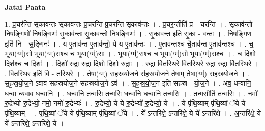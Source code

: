 \documentclass[17pt]{extarticle}
\begin{document}
\textbf{Jatai Paata} \newline

1. प्र॒चर॑न्ति सृ॒काव॑न्तः सृ॒काव॑न्तः प्र॒चर॑न्ति प्र॒चर॑न्ति सृ॒काव॑न्तः । . प्र॒चर॒न्तीति॑ प्र - चर॑न्ति । . सृ॒काव॑न्तो निष॒ङ्गिणो॑ निष॒ङ्गिणः॑ सृ॒काव॑न्तः सृ॒काव॑न्तो निष॒ङ्गिणः॑ । . सृ॒काव॑न्त॒ इति॑ सृ॒का - व॒न्तः॒ । . नि॒ष॒ङ्गिण॒ इति॑ नि - स॒ङ्गिनः॑ । . य ए॒ताव॑न्त ए॒ताव॑न्तो॒ ये य ए॒ताव॑न्तः । . ए॒ताव॑न्तश्च चै॒ताव॑न्त ए॒ताव॑न्तश्च । . च॒ भूया(ग्म्॑)सो॒ भूया(ग्म्॑)सश्च च॒ भूया(ग्म्॑)सः । . भूया(ग्म्॑)सश्च च॒ भूया(ग्म्॑)सो॒ भूया(ग्म्॑)सश्च । . च॒ दिशो॒ दिश॑श्च च॒ दिशः॑ । . दिशो॑ रु॒द्रा रु॒द्रा दिशो॒ दिशो॑ रु॒द्राः । . रु॒द्रा वि॑तस्थि॒रे वि॑तस्थि॒रे रु॒द्रा रु॒द्रा वि॑तस्थि॒रे । . वि॒त॒स्थि॒र इति॑ वि - त॒स्थि॒रे । . तेषा(ग्म्॑) सहस्रयोज॒ने स॑हस्रयोज॒ने तेषा॒म् तेषा(ग्म्॑) सहस्रयोज॒ने । . स॒ह॒स्र॒यो॒ज॒ने ऽवाव॑ सहस्रयोज॒ने स॑हस्रयोज॒ने ऽव॑ । . स॒ह॒स्र॒यो॒ज॒न इति॑ सहस्र - यो॒ज॒ने । . अव॒ धन्वा॑नि॒ धन्वा॒ न्यवाव॒ धन्वा॑नि । . धन्वा॑नि तन्मसि तन्मसि॒ धन्वा॑नि॒ धन्वा॑नि तन्मसि । . त॒न्म॒सीति॑ तन्मसि । . नमो॑ रु॒द्रेभ्यो॑ रु॒द्रेभ्यो॒ नमो॒ नमो॑ रु॒द्रेभ्यः॑ । . रु॒द्रेभ्यो॒ ये ये रु॒द्रेभ्यो॑ रु॒द्रेभ्यो॒ ये । . ये पृ॑थि॒व्याम् पृ॑थि॒व्यां ॅये ये पृ॑थि॒व्याम् । . पृ॒थि॒व्यां ॅये ये पृ॑थि॒व्याम् पृ॑थि॒व्यां ॅये । . ये᳚ ऽन्तरि॑क्षे॒ ऽन्तरि॑क्षे॒ ये ये᳚ ऽन्तरि॑क्षे । . अ॒न्तरि॑क्षे॒ ये ये᳚ ऽन्तरि॑क्षे॒ ऽन्तरि॑क्षे॒ ये । \newline
\end{document}
